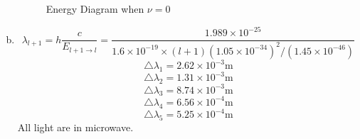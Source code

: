 \documentclass[a4paper]{article}
\begin{document}
\begin{enumerate}[(a)]
\begin{figure}[H]
    \caption{Energy Diagram when $\nu=0$}
    \end{figure}
    \item $$\lambda_{l+1}=h\frac{c}{E_{l+1\rightarrow l}}=\frac{1.989\times10^{-25}}{1.6\times10^{-19}\times(l+1)(1.05\times10^{-34})^2/(1.45\times10^{-46})}$$
    $$\bigtriangleup \lambda_1=2.62\times10^{-3}\text{m}$$
    $$\bigtriangleup \lambda_2=1.31\times10^{-3}\text{m}$$
    $$\bigtriangleup \lambda_3=8.74\times10^{-3}\text{m}$$
    $$\bigtriangleup \lambda_4=6.56\times10^{-4}\text{m}$$
    $$\bigtriangleup \lambda_5=5.25\times10^{-4}\text{m}$$
    All light are in microwave.
\end{enumerate}
\end{document}
